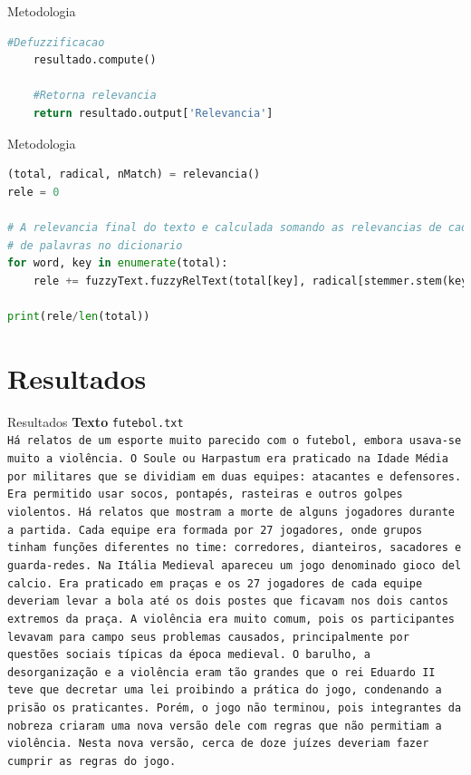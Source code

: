 \documentclass{beamer}
\begin{document}
	\begin{frame}[fragile]{Metodologia}
\begin{lstlisting}[language=Python, caption = Resultado final]	
	#Defuzzificacao
	resultado.compute()
	
	#Retorna relevancia
	return resultado.output['Relevancia']
\end{lstlisting}
	\end{frame}

	\begin{frame}[fragile]{Metodologia}
\begin{lstlisting}[language=Python, caption = Lógica Fuzzy(cont.)]	
(total, radical, nMatch) = relevancia()
rele = 0
	
# A relevancia final do texto e calculada somando as relevancias de cada palavra do dicionario dividido pela quantidade
# de palavras no dicionario
for word, key in enumerate(total):
	rele += fuzzyText.fuzzyRelText(total[key], radical[stemmer.stem(key)], nMatch[stemmer.stem(key)])
	
print(rele/len(total))  
\end{lstlisting}
	\end{frame}
	
	\section{Resultados}
	\begin{frame}{Resultados}
		\textbf{Texto }\texttt{futebol.txt}\\
		\texttt{\tiny Há relatos de um esporte muito parecido com o futebol, embora usava-se muito a violência. O Soule ou Harpastum era praticado na Idade Média por militares que se dividiam em duas equipes: atacantes e defensores. Era permitido usar socos, pontapés, rasteiras e outros golpes violentos. Há relatos que mostram a morte de alguns jogadores durante a partida. Cada equipe era formada por 27 jogadores, onde grupos tinham funções diferentes no time: corredores, dianteiros, sacadores e guarda-redes.
			Na Itália Medieval apareceu um jogo denominado gioco del calcio. Era praticado em praças e os 27 jogadores de cada equipe deveriam levar a bola até os dois postes que ficavam nos dois cantos extremos da praça. A violência era muito comum, pois os participantes levavam para campo seus problemas causados, principalmente por questões sociais típicas da época medieval. 
			O barulho, a desorganização e a violência eram tão grandes que o rei Eduardo II teve que decretar uma lei proibindo a prática do jogo, condenando a prisão os praticantes. Porém, o jogo não terminou, pois integrantes da nobreza criaram uma nova versão dele com regras que não permitiam a violência. Nesta nova versão, cerca de doze juízes deveriam fazer cumprir as regras do jogo.
			}  
	\end{frame}
	
\end{document}
